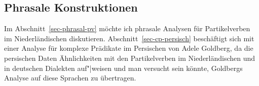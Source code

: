 %

\subsection{Phrasale Konstruktionen}

Im Abschnitt~\ref{sec-phrasal-pv} möchte ich phrasale Analysen für Partikelverben
im Niederländischen diskutieren. Abschnitt~\ref{sec-cp-persisch} beschäftigt sich mit 
einer Analyse für komplexe Prädikate im Persischen
von Adele Goldberg, da die persischen Daten Ähnlichkeiten mit den
Partikelverben im Niederländischen und in deutschen Dialekten auf"|weisen und
man versucht sein könnte, Goldbergs Analyse auf diese Sprachen zu übertragen.

